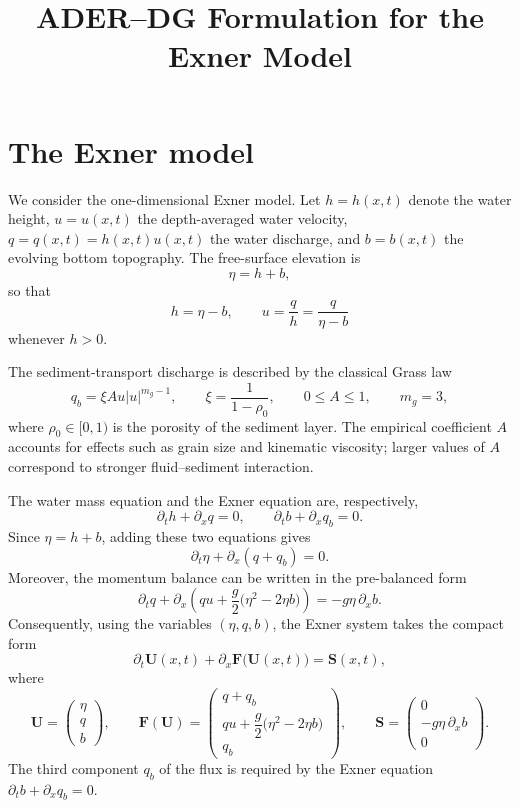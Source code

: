 \documentclass[11pt]{article}
\title{ADER--DG Formulation for the Exner Model}
\author{}
\date{}
\begin{document}
\maketitle

\section{The Exner model}

We consider the one-dimensional Exner model. Let \(h=h(x,t)\) denote the
water height, \(u=u(x,t)\) the depth-averaged water velocity,
\(q=q(x,t)=h(x,t)u(x,t)\) the water discharge, and \(b=b(x,t)\) the evolving
bottom topography. The free-surface elevation is
\[
    \eta=h+b,
\]
so that
\[
    h=\eta-b,
    \qquad
    u=\frac{q}{h}=\frac{q}{\eta-b}
\]
whenever \(h>0\).

The sediment-transport discharge is described by the classical Grass law
\[
    q_b=\xi A u\lvert u\rvert^{m_g-1},
    \qquad
    \xi=\frac{1}{1-\rho_0},
    \qquad
    0\leq A\leq 1,
    \qquad
    m_g=3,
\]
where \(\rho_0\in[0,1)\) is the porosity of the sediment layer. The empirical
coefficient \(A\) accounts for effects such as grain size and kinematic
viscosity; larger values of \(A\) correspond to stronger fluid--sediment
interaction.

The water mass equation and the Exner equation are, respectively,
\[
    \partial_t h+\partial_x q=0,
    \qquad
    \partial_t b+\partial_x q_b=0.
\]
Since \(\eta=h+b\), adding these two equations gives
\[
    \partial_t\eta+\partial_x(q+q_b)=0.
\]
Moreover, the momentum balance can be written in the pre-balanced form
\[
    \partial_t q
    +\partial_x\!\left(
        qu+\frac{g}{2}\bigl(\eta^2-2\eta b\bigr)
    \right)
    =-g\eta\,\partial_x b.
\]
Consequently, using the variables \((\eta,q,b)\), the Exner system takes the
compact form
\begin{equation}
    \partial_t\bm U(x,t)+\partial_x\bm F\bigl(\bm U(x,t)\bigr)
    =\bm S(x,t),
    \tag{6}
    \label{eq:exner-system}
\end{equation}
where
\[
    \bm U=
    \begin{pmatrix}
        \eta\\ q\\ b
    \end{pmatrix},
    \qquad
    \bm F(\bm U)=
    \begin{pmatrix}
        q+q_b\\[1mm]
        qu+\dfrac{g}{2}\bigl(\eta^2-2\eta b\bigr)\\[1mm]
        q_b
    \end{pmatrix},
    \qquad
    \bm S=
    \begin{pmatrix}
        0\\[1mm]
        -g\eta\,\partial_x b\\[1mm]
        0
    \end{pmatrix}.
\]
The third component \(q_b\) of the flux is required by the Exner equation
\(\partial_t b+\partial_x q_b=0\).
\end{document}
